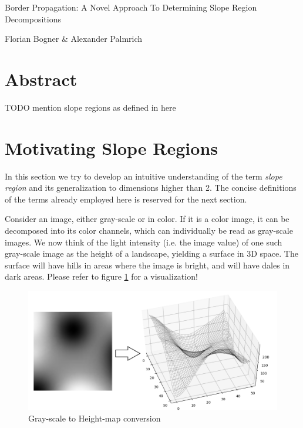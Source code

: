 \documentclass[a4paper,12pt]{paper}
\theoremstyle{plain}
\theoremstyle{definition}
\begin{document}
\begin{titlepage}
\huge
\centering
Border Propagation: A Novel Approach To Determining Slope Region Decompositions

\vfill

\normalsize
Florian Bogner \& Alexander Palmrich
\end{titlepage}




\tableofcontents
\newpage


\section{Abstract}

TODO
mention slope regions as defined in here\cite{kropatsch2019space}

\section{Motivating Slope Regions}

In this section we try to develop an intuitive understanding of the term \emph{slope region} and its generalization to dimensions higher than 2. The concise definitions of the terms already employed here is reserved for the next section.

Consider an image, either gray-scale or in color. If it is a color image, it can be decomposed into its color channels, which can individually be read as gray-scale images. We now think of the light intensity (i.e. the image value) of one such gray-scale image as the height of a landscape, yielding a surface in 3D space. The surface will have hills in areas where the image is bright, and will have dales in dark areas. Please refer to figure \ref{fig:conversion} for a visualization!


\begin{figure}[h]
\includegraphics[width=\textwidth]{img/visu1.png}
\caption{Gray-scale to Height-map conversion}
\label{fig:conversion}
\end{figure}
\end{document}
